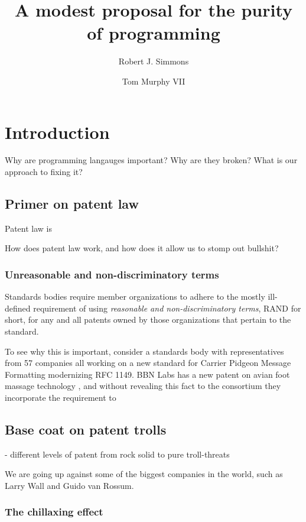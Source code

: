 \documentclass[acmtocl]%
{boviktrans}
\title{A modest proposal for the purity of programming}
\author{Robert J. Simmons \and Tom Murphy VII}
\begin{document}
\maketitle

\section{Introduction}

Why are programming langauges important? Why are they broken? What is our approach to fixing it?

\subsection{Primer on patent law}

Patent law is 

How does patent law work, and how does it allow us to stomp out bullshit?

\subsubsection{Unreasonable and non-discriminatory terms}

Standards bodies require member organizations to adhere to the mostly
ill-defined requirement of using {\it reasonable and
  non-discriminatory terms}, RAND for short, for any and all patents
owned by those organizations that pertain to the standard.

To see why this is important, consider a standards body with
representatives from 57 companies all working on a new standard for
Carrier Pidgeon Message Formatting modernizing RFC 1149. BBN Labs has
a new patent on avian foot massage technology \cite{ebert}, and without
revealing this fact to the consortium they incorporate the requirement
to 

\subsection{Base coat on patent trolls}

- different levels of patent from rock solid to pure troll-threats

We are going up against some of the biggest companies in the world, such as Larry Wall and Guido van Rossum.

\subsubsection{The chillaxing effect}
\end{document}
